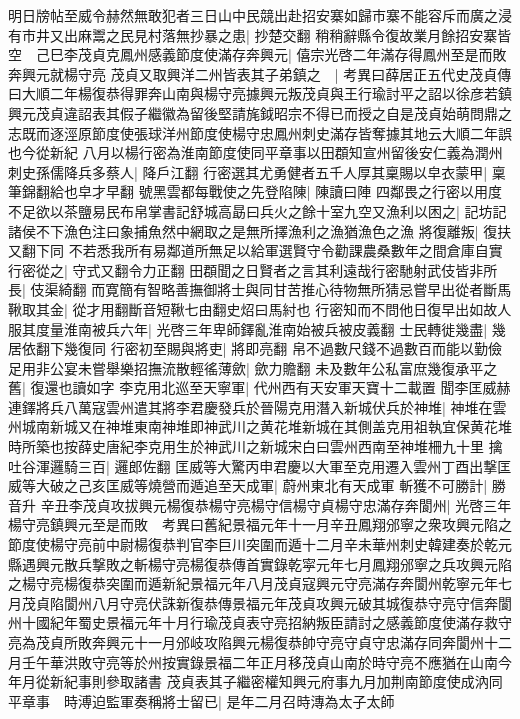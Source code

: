 明日牓帖至威令赫然無敢犯者三日山中民競出赴招安寨如歸市寨不能容斥而廣之浸有市井又出麻鬻之民見村落無抄暴之患|{
	抄楚交翻}
稍稍辭縣令復故業月餘招安寨皆空　己巳李茂貞克鳳州感義節度使滿存奔興元|{
	僖宗光啓二年滿存得鳳州至是而敗奔興元就楊守亮}
茂貞又取興洋二州皆表其子弟鎮之　|{
	考異曰薛居正五代史茂貞傳曰大順二年楊復恭得罪奔山南與楊守亮據興元叛茂貞與王行瑜討平之詔以徐彦若鎮興元茂貞違詔表其假子繼徽為留後堅請旄鉞昭宗不得已而授之自是茂貞始萌問鼎之志既而逐涇原節度使張球洋州節度使楊守忠鳳州刺史滿存皆奪據其地云大順二年誤也今從新紀}
八月以楊行密為淮南節度使同平章事以田頵知宣州留後安仁義為潤州刺史孫儒降兵多蔡人|{
	降戶江翻}
行密選其尤勇健者五千人厚其稟賜以皁衣蒙甲|{
	稟筆錦翻給也皁才早翻}
號黑雲都每戰使之先登陷陳|{
	陳讀曰陣}
四鄰畏之行密以用度不足欲以茶鹽易民布帛掌書記舒城高勗曰兵火之餘十室九空又漁利以困之|{
	記坊記諸侯不下漁色注曰象捕魚然中網取之是無所擇漁利之漁猶漁色之漁}
將復離叛|{
	復扶又翻下同}
不若悉我所有易鄰道所無足以給軍選賢守令勸課農桑數年之間倉庫自實行密從之|{
	守式又翻令力正翻}
田頵聞之日賢者之言其利遠哉行密馳射武伎皆非所長|{
	伎渠綺翻}
而寛簡有智略善撫御將士與同甘苦推心待物無所猜忌嘗早出從者斷馬鞦取其金|{
	從才用翻斷音短鞦七由翻史炤曰馬紂也}
行密知而不問他日復早出如故人服其度量淮南被兵六年|{
	光啓三年卑師鐸亂淮南始被兵被皮義翻}
士民轉徙幾盡|{
	幾居依翻下幾復同}
行密初至賜與將吏|{
	將即亮翻}
帛不過數尺錢不過數百而能以勤儉足用非公宴未嘗舉樂招撫流散輕徭薄歛|{
	歛力贍翻}
未及數年公私富庶幾復承平之舊|{
	復還也讀如字}
李克用北巡至天寧軍|{
	代州西有天安軍天寶十二載置}
聞李匡威赫連鐸將兵八萬寇雲州遣其將李君慶發兵於晉陽克用潛入新城伏兵於神堆|{
	神堆在雲州城南新城又在神堆東南神堆即神武川之黄花堆新城在其側盖克用祖執宜保黄花堆時所築也按薛史唐紀李克用生於神武川之新城宋白曰雲州西南至神堆柵九十里}
擒吐谷渾邏騎三百|{
	邏郎佐翻}
匡威等大驚丙申君慶以大軍至克用遷入雲州丁酉出撃匡威等大破之己亥匡威等燒營而遁追至天成軍|{
	蔚州東北有天成軍}
斬獲不可勝計|{
	勝音升}
辛丑李茂貞攻拔興元楊復恭楊守亮楊守信楊守貞楊守忠滿存奔閬州|{
	光啓三年楊守亮鎮興元至是而敗　考異曰舊紀景福元年十一月辛丑鳳翔邠寧之衆攻興元陷之節度使楊守亮前中尉楊復恭判官李巨川突圍而遁十二月辛未華州刺史韓建奏於乾元縣遇興元散兵撃敗之斬楊守亮楊復恭傳首實錄乾寜元年七月鳳翔邠寧之兵攻興元陷之楊守亮楊復恭突圍而遁新紀景福元年八月茂貞寇興元守亮滿存奔閬州乾寧元年七月茂貞陷閬州八月守亮伏誅新復恭傳景福元年茂貞攻興元破其城復恭守亮守信奔閬州十國紀年蜀史景福元年十月行瑜茂貞表守亮招納叛臣請討之感義節度使滿存救守亮為茂貞所敗奔興元十一月邠岐攻陷興元楊復恭帥守亮守貞守忠滿存同奔閬州十二月壬午華洪敗守亮等於州按實錄景福二年正月移茂貞山南於時守亮不應猶在山南今年月從新紀事則參取諸書}
茂貞表其子繼密權知興元府事九月加荆南節度使成汭同平章事　時溥迫監軍奏稱將士留已|{
	是年二月召時漙為太子太師}
